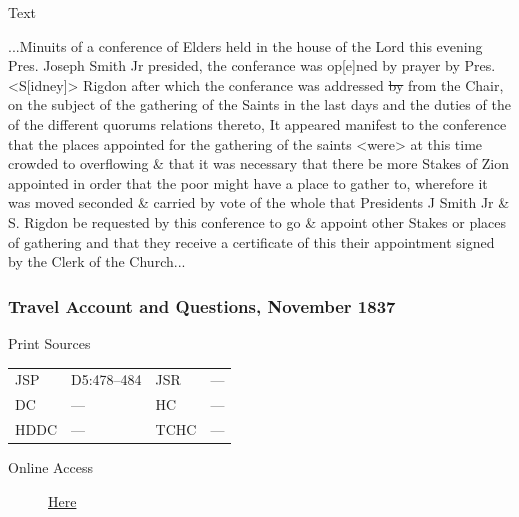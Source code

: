 				\begin{description}
					\item[Text]
				\end{description}
				
					...Minuits of a conference of Elders held in the house of the Lord this evening Pres. Joseph Smith Jr presided, the conferance was op[e]ned by prayer by Pres. <S[idney]> Rigdon after which the conferance was addressed \sout{by} from the Chair, on the subject of the gathering of the Saints in the last days and the duties of the of the different quorums relations thereto, It appeared manifest to the conference that the places appointed for the gathering of the saints <were> at this time crowded to overflowing \& that it was necessary that there be more Stakes of Zion appointed in order that the poor might have a place to gather to, wherefore it was moved seconded \& carried by vote of the whole that Presidents J Smith Jr \& S. Rigdon be requested by this conference to go \& appoint other Stakes or places of gathering and that they receive a certificate of this their appointment signed by the Clerk of the Church...
					
		\subsubsection{Travel Account and Questions, November 1837}
			\label{EMS-1837-JS-NOV-1837}
			
			\begin{description}
					\item[Print Sources]
				\end{description}

					\begin{tabular}{p{0.5in}p{1in}p{0.5in}p{1in}}
					JSP	 	& D5:478--484		& JSR 		& --- \\
					DC	 	& ---				& HC 		& --- \\
					HDDC 	& ---				& TCHC 		& --- \\
					\end{tabular}
				
				\begin{description}
					\item[Online Access] \href{https://www.josephsmithpapers.org/paper-summary/travel-account-and-questions-november-1837/1}{Here}
				\end{description}
				
